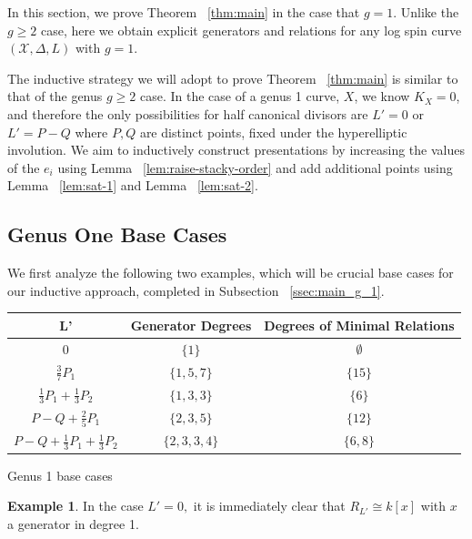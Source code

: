 \documentclass{amsart}
\theoremstyle{plain}
\theoremstyle{definition}
\newtheorem{example}[thm]{Example}
\theoremstyle{remark}
\numberwithin{equation}{section}
\newcommand\ssec{\subsection}
\newcommand \sx{\mathscr X}
\newcommand \halfcan{L}
\begin{document}
In this section, we prove Theorem ~\ref{thm:main} in the case that $g = 1$. Unlike the $g \geq 2$ case, here we obtain explicit generators and relations for any log spin curve $(\sx, \Delta, L)$ with $g = 1$.

The inductive strategy we will adopt to prove Theorem ~\ref{thm:main} is similar to that of the genus $g \geq 2$ case. In the case of a genus 1 curve, $X$, we know $K_X = 0$, and therefore the only possibilities for half canonical divisors are $\halfcan' = 0$ or $\halfcan' = P - Q$ where $P,Q$ are distinct points, fixed  under the hyperelliptic involution. We aim to inductively construct presentations by increasing the values of the $e_i$ using Lemma ~\ref{lem:raise-stacky-order} and add additional points using Lemma ~\ref{lem:sat-1} and Lemma ~\ref{lem:sat-2}.

\ssec{Genus One Base Cases}
\label{ssec:g_1_base}

We first analyze the following two examples, which will be crucial base cases for our inductive approach, completed in Subsection ~\ref{ssec:main_g_1}.

\begin{longtable}	{| c || c | c |}
	\hline
	L' & Generator Degrees & Degrees of Minimal Relations \\
	\hline
	\hline
	$0$ & $\{1\}$ & $\emptyset$ \\	\hline

	$\frac{3}{7}P_1$ & $\{1,5,7\}$ & $\{15\}$ \\	\hline
	
	$\frac{1}{3}P_1 + \frac{1}{3}P_2$ & $\{1, 3, 3\}$ & $\{6\}$ \\	\hline
	
	$P - Q + \frac{2}{5}P_1$ & $\{2,3,5\}$ & $\{12\}$ \\	\hline
	
	$P - Q + \frac{1}{3}P_1 + \frac{1}{3}P_2$ & $\{2, 3, 3, 4\}$ & $\{6,8\}$ \\	\hline
	
\end{longtable}

\begin{center}
\label{table:g-1-base}
Genus 1 base cases
\end{center}


\begin{example}
\label{eg:base-1-0}
In the case $\halfcan' = 0,$ it is immediately clear that $R_{\halfcan'} \cong k[x]$ with $x$ a generator in degree 1.
\end{example}
\end{document}
